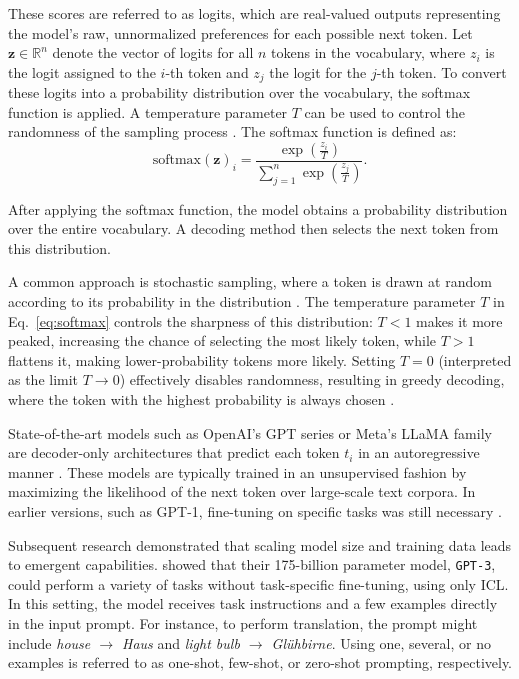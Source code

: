 \documentclass[a4paper,oneside,bibliography=totoc]{scrbook}
\begin{document}
These scores are referred to as logits, which are real-valued outputs representing the model’s raw, unnormalized preferences for each possible next token. Let $\mathbf{z} \in \mathbb{R}^n$ denote the vector of logits for all $n$ tokens in the vocabulary, where $z_i$ is the logit assigned to the $i$-th token and $z_j$ the logit for the $j$-th token. To convert these logits into a probability distribution over the vocabulary, the softmax function is applied. A temperature parameter $T$ can be used to control the randomness of the sampling process \cite{Peeperkorn2024}. The softmax function is defined as:
\begin{equation}
  \label{eq:softmax}
  \mathrm{softmax}(\mathbf{z})_i = \frac{\exp\left(\frac{z_i}{T}\right)}{\sum_{j=1}^{n} \exp\left(\frac{z_j}{T}\right)}.
\end{equation}

After applying the softmax function, the model obtains a probability distribution over the entire vocabulary. A decoding method then selects the next token from this distribution.

A common approach is stochastic sampling, where a token is drawn at random according to its probability in the distribution \cite{Brown2020}. The temperature parameter $T$ in Eq.~\eqref{eq:softmax} controls the sharpness of this distribution: $T < 1$ makes it more peaked, increasing the chance of selecting the most likely token, while $T > 1$ flattens it, making lower-probability tokens more likely. Setting $T = 0$ (interpreted as the limit $T \to 0$) effectively disables randomness, resulting in greedy decoding, where the token with the highest probability is always chosen \cite{Peeperkorn2024}.

State-of-the-art models such as OpenAI’s \ac{GPT} series or Meta’s \ac{LLaMA} family are decoder-only architectures that predict each token $t_i$ in an autoregressive manner \cite{Radford2018,Grattafiori2024}. These models are typically trained in an unsupervised fashion by maximizing the likelihood of the next token over large-scale text corpora. In earlier versions, such as GPT-1, fine-tuning on specific tasks was still necessary \cite{Radford2018}.

Subsequent research demonstrated that scaling model size and training data leads to emergent capabilities. \citet{Brown2020} showed that their 175-billion parameter model, \texttt{GPT-3}, could perform a variety of tasks without task-specific fine-tuning, using only \ac{ICL}. In this setting, the model receives task instructions and a few examples directly in the input prompt. For instance, to perform translation, the prompt might include \textit{house $\rightarrow$ Haus} and \textit{light bulb $\rightarrow$ Glühbirne}. Using one, several, or no examples is referred to as one-shot, few-shot, or zero-shot prompting, respectively.
\end{document}
